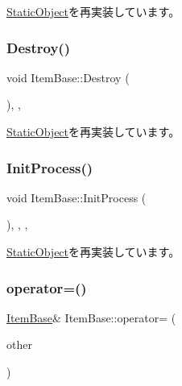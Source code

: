 \mbox{\hyperlink{class_static_object_a64c8803ff881d578d103413e299dbf7f}{Static\+Object}}を再実装しています。

\mbox{\label{class_item_base_ab34d53b8f3442da77466ba1b9132386e}} 
\subsubsection{\texorpdfstring{Destroy()}{Destroy()}}
{\footnotesize\ttfamily void Item\+Base\+::\+Destroy (\begin{DoxyParamCaption}{ }\end{DoxyParamCaption})\hspace{0.3cm}{\ttfamily [inline]}, {\ttfamily [final]}, {\ttfamily [virtual]}}



\mbox{\hyperlink{class_static_object_a8e9fb321b4f8f12c4bec1bc66853512f}{Static\+Object}}を再実装しています。

\mbox{\label{class_item_base_a772804cb3c663b35e44d49913d1f1cef}} 
\subsubsection{\texorpdfstring{Init\+Process()}{InitProcess()}}
{\footnotesize\ttfamily void Item\+Base\+::\+Init\+Process (\begin{DoxyParamCaption}{ }\end{DoxyParamCaption})\hspace{0.3cm}{\ttfamily [inline]}, {\ttfamily [final]}, {\ttfamily [protected]}, {\ttfamily [virtual]}}



\mbox{\hyperlink{class_static_object_afa0709f50495338a23c1140062a567af}{Static\+Object}}を再実装しています。

\mbox{\label{class_item_base_a94bf9130253e36ba8b1d4019bf5b8a3a}} 
\subsubsection{\texorpdfstring{operator=()}{operator=()}\hspace{0.1cm}{\footnotesize\ttfamily [1/2]}}
{\footnotesize\ttfamily \mbox{\hyperlink{class_item_base}{Item\+Base}}\& Item\+Base\+::operator= (\begin{DoxyParamCaption}\item[{const \mbox{\hyperlink{class_item_base}{Item\+Base}} \&}]{other }\end{DoxyParamCaption})\hspace{0.3cm}{\ttfamily [inline]}}



